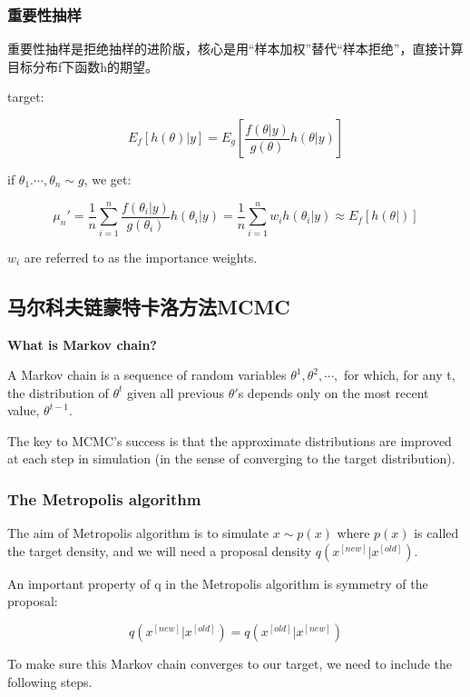 \documentclass[
]{book}
\begin{document}
\subsubsection{重要性抽样}\label{ux91cdux8981ux6027ux62bdux6837}

重要性抽样是拒绝抽样的进阶版，核心是用``样本加权''替代``样本拒绝''，直接计算目标分布f下函数h的期望。

target:

\[
E_f[h(\theta)|y]=E_g[\frac{f(\theta|y)}{g(\theta)}h(\theta|y)]
\]

if \(\theta_1.\cdots,\theta_n\sim g\), we get:

\[
\mu_n'=\frac{1}{n}\sum_{i=1}^n\frac{f(\theta_i|y)}{g(\theta_i)}h(\theta_i|y)=\frac{1}{n}\sum_{i=1}^nw_ih(\theta_i|y)\approx E_f[h(\theta|)]
\]

\(w_i\) are referred to as the importance weights.

\subsection{马尔科夫链蒙特卡洛方法MCMC}\label{ux9a6cux5c14ux79d1ux592bux94feux8499ux7279ux5361ux6d1bux65b9ux6cd5mcmc}

\textbf{What is Markov chain?}

A Markov chain is a sequence of random variables \(\theta^1,\theta^2,\cdots,\) for which, for any t, the distribution of \(\theta^t\) given all previous \(\theta'\)s depends only on the most recent value, \(\theta^{t-1}\).

The key to MCMC's success is that the approximate distributions are improved at each step in simulation (in the sense of converging to the target distribution).

\subsubsection{The Metropolis algorithm}\label{the-metropolis-algorithm}

The aim of Metropolis algorithm is to simulate \(x\sim p(x)\) where \(p(x)\) is called the target density, and we will need a proposal density \(q(x^{[new]}|x^{[old]})\).

An important property of q in the Metropolis algorithm is symmetry of the proposal:

\[
q(x^{[new]}|x^{[old]})=q(x^{[old]}|x^{[new]})
\]

To make sure this Markov chain converges to our target, we need to include the following steps.
\end{document}
